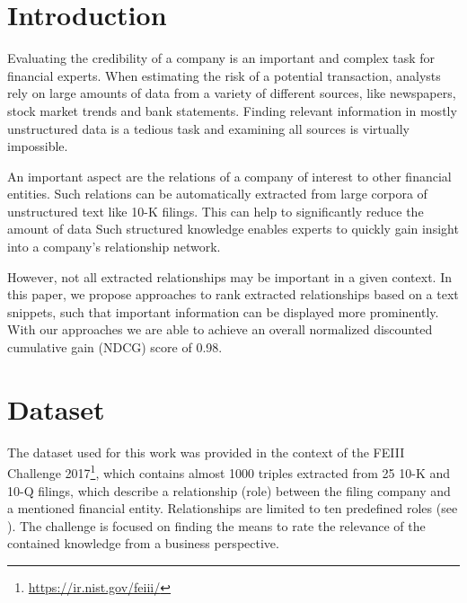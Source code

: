 \section{Introduction}

Evaluating the credibility of a company is an important and complex task for financial experts.
When estimating the risk of a potential transaction, analysts rely on large amounts of data from a variety of different sources, like newspapers, stock market trends and bank statements.
Finding relevant information in mostly unstructured data is a tedious task and examining all sources is virtually impossible.

An important aspect are the relations of a company of interest to other financial entities.
Such relations can be automatically extracted from large corpora of unstructured text\cite{entityextraction} like 10-K filings.
This can help to significantly reduce the amount of data
Such structured knowledge enables experts to quickly gain insight into a company's relationship network.

However, not all extracted relationships may be important in a given context.
In this paper, we propose approaches to rank extracted relationships based on a text snippets, such that important information can be displayed more prominently.
With our approaches we are able to achieve an overall normalized discounted cumulative gain (NDCG) score of 0.98.

\section{Dataset}
The dataset used for this work was provided in the context of the FEIII Challenge 2017\footnote{\url{https://ir.nist.gov/feiii/}}, which contains almost 1000 triples extracted from 25 10-K and 10-Q filings, which describe a relationship (role) between the filing company and a mentioned financial entity.
Relationships are limited to ten predefined roles (see ).
The challenge is focused on finding the means to rate the relevance of the contained knowledge from a business perspective.

